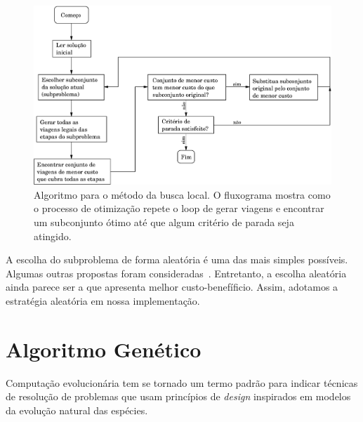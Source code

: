 \begin{figure}[htbp]
	\begin{center}
		\includegraphics[scale=0.6]{fig/localsearch.eps}
		\caption{Algoritmo para o método da busca local. O fluxograma mostra como o processo de 
		otimização repete o loop de gerar viagens e encontrar um subconjunto ótimo até que
		algum critério de parada seja atingido.}
		\label{fig:busca_local}
	\end{center}
\end{figure}

A escolha do subproblema de forma aleatória é uma das mais simples possíveis. Algumas outras 
propostas foram consideradas~\cite{anbil91a,arabeyre69}. Entretanto, a escolha aleatória ainda
parece ser a que apresenta melhor custo-benefíficio. Assim, adotamos a estratégia aleatória em
nossa implementação.


\section{Algoritmo Genético}
\label{sec:metodos_genetico}

Computação evolucionária tem se tornado um termo padrão para indicar técnicas de resolução de 
problemas que usam princípios de {\it design} inspirados em modelos da evolução natural das
espécies.

